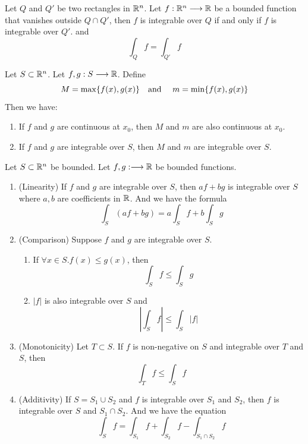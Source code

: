 \begin{lemma}
    Let $Q$ and $Q'$ be two rectangles in $\mathbb{R}^n$. Let $f:\mathbb{R}^n\longrightarrow\mathbb{R}$ be a bounded function that vanishes outside $Q\cap Q'$, then $f$ is integrable over $Q$ if and only if $f$ is integrable over $Q'$. and
    $$\int_Qf=\int_{Q'}f$$
\end{lemma}


\begin{lemma}
    Let $S\subset \mathbb{R}^n$. Let $f,g:S\longrightarrow \mathbb{R}$. Define 
    $$M=\max\{f(x),g(x)\} \text{\quad and \quad}m=\min\{f(x),g(x)\}$$ 
    Then we have:
    \begin{enumerate}
        \item If $f$ and $g$ are continuous at $x_0$, then $M$ and $m$ are also continuous at $x_0$.
        \item If $f$ and $g$ are integrable over $S$, then $M$ and $m$ are integrable over $S$.
    \end{enumerate}
\end{lemma}


\begin{theorem} \label{properties of integral}
    Let $S\subset \mathbb{R}^n$ be bounded. Let $f,g:\longrightarrow \mathbb{R}$ be bounded functions.
    \begin{enumerate}
        \item (Linearity) If $f$ and $g$ are integrable over $S$, then $af+bg$ is integrable over $S$ where $a,b$ are coefficients in $\mathbb{R}$. And we have the formula $$\int_S(af+bg)=a\int_Sf+b\int_Sg$$
        \item (Comparison) Suppose $f$ and $g$ are integrable over $S$.
        \begin{enumerate}
            \item If $\forall x \in S.f(x)\leq g(x)$, then $$\int_Sf\leq \int_Sg$$
            \item $|f|$ is also integrable over $S$ and $$\left|\int_Sf\right|\leq \int_S|f|$$
        \end{enumerate}
        \item (Monotonicity) Let $T\subset S$. If $f$ is non-negative on $S$ and integrable over $T$ and $S$, then $$\int_Tf\leq \int_Sf$$
        \item (Additivity) If $S=S_1\cup S_2$ and $f$ is integrable over $S_1$ and $S_2$, then $f$ is integrable over $S$ and $S_1\cap S_2$. And we have the equation $$\int_Sf=\int_{S_1}f+\int_{S_2}f-\int_{S_1\cap S_2}f$$
    \end{enumerate}
\end{theorem}


